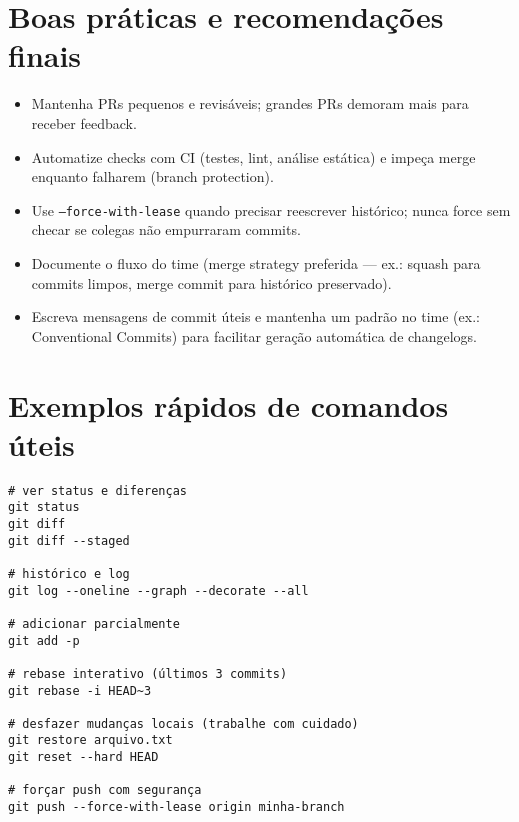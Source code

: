\section{Boas práticas e recomendações finais}
\begin{itemize}
  \item Mantenha PRs pequenos e revisáveis; grandes PRs demoram mais para receber feedback.  
  \item Automatize checks com CI (testes, lint, análise estática) e impeça merge enquanto falharem (branch protection).  
  \item Use \texttt{--force-with-lease} quando precisar reescrever histórico; nunca force sem checar se colegas não empurraram commits.  
  \item Documente o fluxo do time (merge strategy preferida — ex.: squash para commits limpos, merge commit para histórico preservado).  
  \item Escreva mensagens de commit úteis e mantenha um padrão no time (ex.: Conventional Commits) para facilitar geração automática de changelogs.
\end{itemize}

\section{Exemplos rápidos de comandos úteis}
\begin{verbatim}
# ver status e diferenças
git status
git diff
git diff --staged

# histórico e log
git log --oneline --graph --decorate --all

# adicionar parcialmente
git add -p

# rebase interativo (últimos 3 commits)
git rebase -i HEAD~3

# desfazer mudanças locais (trabalhe com cuidado)
git restore arquivo.txt
git reset --hard HEAD

# forçar push com segurança
git push --force-with-lease origin minha-branch
\end{verbatim}

